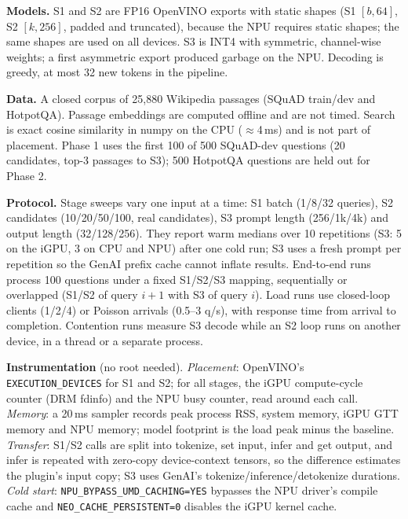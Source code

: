 \documentclass[10pt]{article}
\begin{document}
\textbf{Models.} S1 and S2 are FP16 OpenVINO exports with static shapes (S1 $[b,64]$, S2 $[k,256]$, padded and truncated), because the NPU requires static shapes; the same shapes are used on all devices. S3 is INT4 with symmetric, channel-wise weights; a first asymmetric export produced garbage on the NPU. Decoding is greedy, at most 32 new tokens in the pipeline.

\textbf{Data.} A closed corpus of 25,880 Wikipedia passages (SQuAD train/dev and HotpotQA). Passage embeddings are computed offline and are not timed. Search is exact cosine similarity in numpy on the CPU ($\approx$4\,ms) and is not part of placement. Phase 1 uses the first 100 of 500 SQuAD-dev questions (20 candidates, top-3 passages to S3); 500 HotpotQA questions are held out for Phase 2.

\textbf{Protocol.} Stage sweeps vary one input at a time: S1 batch (1/8/32 queries), S2 candidates (10/20/50/100, real candidates), S3 prompt length (256/1k/4k) and output length (32/128/256). They report warm medians over 10 repetitions (S3: 5 on the iGPU, 3 on CPU and NPU) after one cold run; S3 uses a fresh prompt per repetition so the GenAI prefix cache cannot inflate results. End-to-end runs process 100 questions under a fixed S1/S2/S3 mapping, sequentially or overlapped (S1/S2 of query $i{+}1$ with S3 of query $i$). Load runs use closed-loop clients (1/2/4) or Poisson arrivals (0.5--3 q/s), with response time from arrival to completion. Contention runs measure S3 decode while an S2 loop runs on another device, in a thread or a separate process.

\textbf{Instrumentation} (no root needed). \emph{Placement}: OpenVINO's \texttt{EXECUTION\_DEVICES} for S1 and S2; for all stages, the iGPU compute-cycle counter (DRM fdinfo) and the NPU busy counter, read around each call. \emph{Memory}: a 20\,ms sampler records peak process RSS, system memory, iGPU GTT memory and NPU memory; model footprint is the load peak minus the baseline. \emph{Transfer}: S1/S2 calls are split into tokenize, set input, infer and get output, and infer is repeated with zero-copy device-context tensors, so the difference estimates the plugin's input copy; S3 uses GenAI's tokenize/inference/detokenize durations. \emph{Cold start}: \texttt{NPU\_BYPASS\_UMD\_CACHING=YES} bypasses the NPU driver's compile cache and \texttt{NEO\_CACHE\_PERSISTENT=0} disables the iGPU kernel cache.
\end{document}
